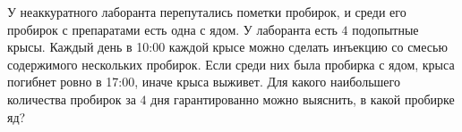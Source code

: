 У неаккуратного лаборанта перепутались пометки пробирок, и среди его пробирок с препаратами есть одна с ядом. У лаборанта есть $4$ подопытные крысы. Каждый день в 10:00 каждой крысе можно сделать инъекцию со смесью содержимого нескольких пробирок. Если среди них была пробирка с ядом, крыса погибнет ровно в 17:00, иначе крыса выживет. Для какого наибольшего количества пробирок за $4$ дня гарантированно можно выяснить, в какой пробирке яд?